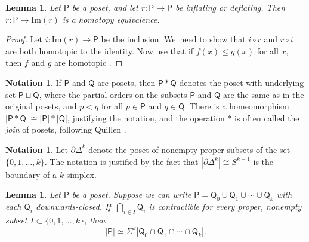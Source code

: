 \documentclass[JEP,XML,SOM,Unicode,NoFloatCountersInSection,published]{cedram}
\theoremstyle{plain}
\newtheorem{lem}[thm]{Lemma}
\theoremstyle{definition}
\newtheorem{notation}[thm]{Notation}
\newcommand{\Po}{\mathsf{P}}
\begin{document}
\begin{lem}\label{monotone}Let $\mathsf P$ be a poset, and let $r\colon\mathsf P\to \mathsf P$ be inflating or deflating. Then $r\colon\mathsf P\to \mathrm{Im}(r)$ is a homotopy equivalence.
\end{lem}

\begin{proof}Let $i:\mathrm{Im}(r) \to \Po$ be the inclusion. We~need to show that $i \circ r$ and $r \circ i$ are both homotopic to the identity.
Now use that if $f(x) \leq g(x)$ for all $x$, then $f$ and $g$ are homotopic \cite[\S1.3]{quillen-homotopyproperties}.
\end{proof}

\begin{notation}\label{notation:quillenjoin}
If $\mathsf P$ and $\mathsf Q$ are posets, then $\mathsf P \ast \mathsf Q$ denotes the poset with underlying set $\mathsf P \sqcup\mathsf Q$, where the partial orders on the subsets $\mathsf P$ and $\mathsf Q$ are the same as in the original posets, and $p < q$ for all $p \in \mathsf P$ and $q \in \mathsf Q$. There is a homeomorphism $|\mathsf P \ast\mathsf Q| \cong |\mathsf P| \ast |\mathsf Q|$, justifying the notation, and the operation $\ast$ is often called the \emph{join} of posets, following Quillen \cite[p.\,104]{quillen-homotopyproperties}.
\end{notation}

\begin{notation}
Let ${\partial\mathsf\Delta}^k$ denote the poset of nonempty proper subsets of the set $\{0,1,\dots,k\}$. The notation is justified by the fact that $|\partial\mathsf\Delta^k| \cong S^{k-1}$ is the boundary of a $k$-simplex.
\end{notation}

\begin{lem}\label{hocolim2}
Let $\mathsf P$ be a poset. Suppose we can write $\mathsf P = \mathsf Q_0 \cup \mathsf Q_1 \cup \cdots \cup \mathsf Q_k$ with each $\mathsf Q_i$ downwards-closed. If~$\bigcap_{i \in I}\mathsf Q_i$ is contractible for every proper, nonempty subset $I \subset \{0, 1,\ldots, k\}$, then\[
|\mathsf P| \simeq \Sigma^{k} |\mathsf Q_0 \cap \mathsf Q_1\cap \cdots \cap \mathsf Q_k|.
\]
\end{lem}
\end{document}
